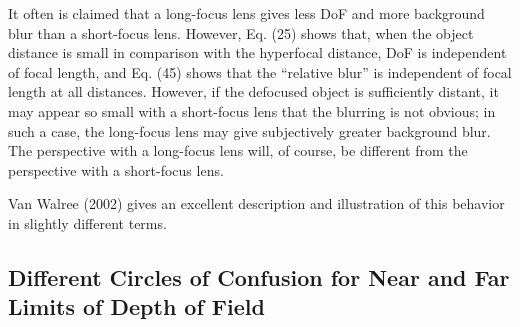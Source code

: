 \documentclass[11pt, oneside]{scrartcl}   	%
\begin{document}
It often is claimed that a long-focus lens gives less DoF and more background blur than a short-focus lens. However, Eq. (25) shows that, when the object distance is small in comparison with the hyperfocal distance, DoF is independent of focal length, and Eq. (45) shows that the “relative blur” is independent of focal length at all distances. However, if the defocused object is sufficiently distant, it may appear so small with a short-focus lens that the blurring is not obvious; in such a case, the long-focus lens may give subjectively greater background blur. The perspective with a long-focus lens will, of course, be different from the perspective with a short-focus lens.

Van Walree (2002) gives an excellent description and illustration of this behavior in slightly different terms.

\subsection{Different Circles of Confusion for Near and Far Limits of Depth of Field}


\end{document}
